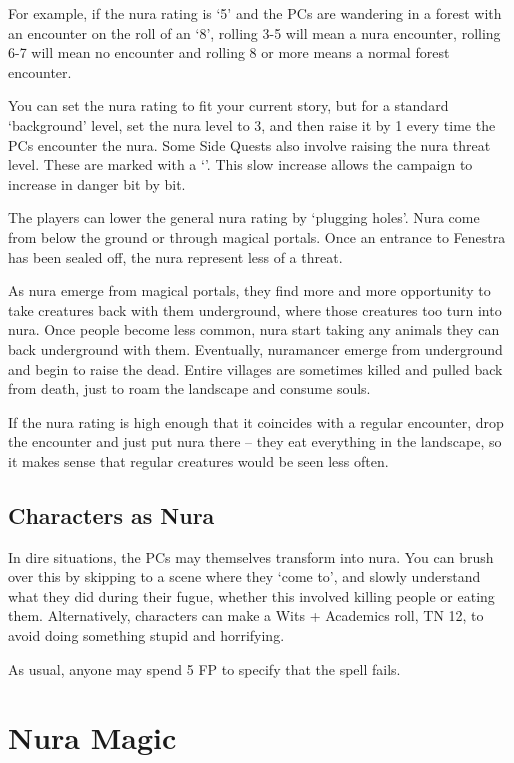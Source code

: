 \begin{multicols}{2}
For example, if the nura rating is `5' and the PCs are wandering in a forest with an encounter on the roll of an `8', rolling 3-5 will mean a nura encounter, rolling 6-7 will mean no encounter and rolling 8 or more means a normal forest encounter.

You can set the nura rating to fit your current story, but for a standard `background' level, set the nura level to 3, and then raise it by 1 every time the PCs encounter the nura.
Some Side Quests also involve raising the nura threat level.  These are marked with a `\N'.
This slow increase allows the campaign to increase in danger bit by bit.

The players can lower the general nura rating by `plugging holes'.
Nura come from below the ground or through magical portals.
Once an entrance to Fenestra has been sealed off, the nura represent less of a threat.

As nura emerge from magical portals, they find more and more opportunity to take creatures back with them underground, where those creatures too turn into nura.
Once people become less common, nura start taking any animals they can back underground with them.
Eventually, nuramancer emerge from underground and begin to raise the dead.
Entire villages are sometimes killed and pulled back from death, just to roam the landscape and consume souls.

If the nura rating is high enough that it coincides with a regular encounter, drop the encounter and just put nura there -- they eat everything in the landscape, so it makes sense that regular creatures would be seen less often.

\subsection{Characters as Nura}

In dire situations, the PCs may themselves transform into nura.
You can brush over this by skipping to a scene where they `come to', and slowly understand what they did during their fugue, whether this involved killing people or eating them.
Alternatively, characters can make a Wits + Academics roll, TN 12, to avoid doing something stupid and horrifying.

As usual, anyone may spend 5 FP to specify that the spell fails.

\end{multicols}

\section{Nura Magic}\label{saurecanta}

